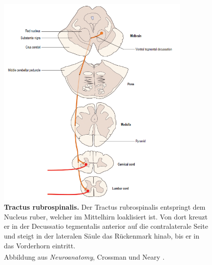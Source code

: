 \documentclass[12pt,a4paper,pdftex]{article}
\begin{document}
\begin{figure}[H]
    \centering
    \includegraphics[width=0.85\textwidth]{pictures/Bilder_Laura/rubrospinal_tract.PNG}
    \caption[Tractus rubrospinalis]{\textbf{Tractus rubrospinalis.} Der Tractus rubrospinalis entspringt dem Nucleus ruber, welcher im Mittelhirn loaklisiert ist. Von dort kreuzt er in der Decussatio tegmentalis anterior auf die contralaterale Seite und steigt in der lateralen Säule das Rückenmark hinab, bis er in das Vorderhorn eintritt. \\
    Abbildung aus \textit{Neuroanatomy}, Crossman und Neary \textsuperscript{\cite[8]{crossman2014neuroanatomy}}.}
    \label{fig:tr_rubrospinalis}
\end{figure}
\end{document}
